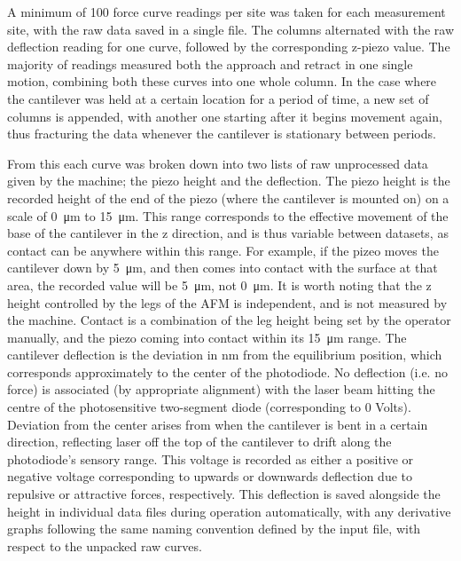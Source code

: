 A minimum of 100 force curve readings per site was taken for each measurement site, with the raw data saved in a single file. The columns alternated with the raw deflection reading for one curve, followed by the corresponding z-piezo value. The majority of readings measured both the approach and retract in one single motion, combining both these curves into one whole column. In the case where the cantilever was held at a certain location for a period of time, a new set of columns is appended, with another one starting after it begins movement again, thus fracturing the data whenever the cantilever is stationary between periods.

From this each curve was broken down into two lists of raw unprocessed data given by the machine; the piezo height and the deflection. The piezo height is the recorded height of the end of the piezo (where the cantilever is mounted on) on a scale of \SI{0}{\micro\metre} to \SI{15}{\micro\metre}. This range corresponds to the effective movement of the base of the cantilever in the z direction, and is thus variable between datasets, as contact can be anywhere within this range. For example, if the pizeo moves the cantilever down by \SI{5}{\micro\metre}, and then comes into contact with the surface at that area, the recorded value will be \SI{5}{\micro\metre}, not \SI{0}{\micro\metre}. It is worth noting that the z height controlled by the legs of the AFM is independent, and is not measured by the machine. Contact is a combination of the leg height being set by the operator manually, and the piezo coming into contact within its \SI{15}{\micro\metre} range. The cantilever deflection is the deviation in nm from the equilibrium position, which corresponds approximately to the center of the photodiode. No deflection (i.e. no force) is associated (by appropriate alignment) with the laser beam hitting the centre of the photosensitive two-segment diode (corresponding to 0 Volts). Deviation from the center arises from when the cantilever is bent in a certain direction,  reflecting laser off the top of the cantilever to drift along the photodiode's sensory range. This voltage is recorded as either a positive or negative voltage corresponding to upwards or downwards deflection due to repulsive or attractive forces, respectively.  This deflection is saved alongside the height in individual data files during operation automatically, with any derivative graphs following the same naming convention defined by the input file, with respect to the unpacked raw curves. 

